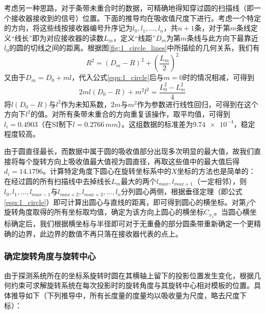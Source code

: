 考虑另一种思路，对于条带未重合时的数据，可精确地得知穿过圆的扫描线（即一个接收器接收到的信号）位置。下面的推导均在吸收值尺度下进行。考虑一个特定的方向，将这些线按接收器编号升序记为$l_0, l_1, \hdots, l_n$，共$n+1$条，对于第$m$条线定义“线长”即为对应接收器的读数$L_m$，定义“线距”$D_m$为第$m$条线与此方向下最靠近$l_0$的圆的切线之间的距离。根据图\ref{fig:1_circle_lines}中所描绘的几何关系，我们有
\begin{equation}\label{equ:1_circle}
  R^2=(D_m-R)^2+(\frac{L_m}{2})^2
\end{equation}
又由于$D_m=D_0+m l$，代入公式\ref{equ:1_circle}后与$m=0$时的情况相减，可得到
\begin{equation}\label{equ:1_reg}
  2 m l(D_0-R) + m^2 l^2 = \frac{L_0^2-L_m^2}{4}
\end{equation}
将$l(D_0-R)$与$l^2$作为未知系数，$2m$与$m^2$作为参数进行线性回归，可得到在这个方向下$l^2$的值。对所有条带未重合的方向重复该操作，取平均值，可得到$l_i=0.4903$（在SI制下$l=0.2766\,\si{mm}$）。这组数据的标准差为$\num{9.74e-4}$，稳定程度较高。

由于圆直径最长，而数据中属于圆的吸收值部分出现多次明显的最大值，故我们直接将每个旋转方向上吸收值最大值视为圆直径，再取这些值中的最大值后得$d_i=14.1796$。计算特定角度下圆心在旋转坐标系中的$X$坐标的方法也是简单的：在经过圆的所有扫描线中去掉线长$L_m$最大的两个$l_{max}, l_{max+1}$（一定相邻），则$l_0, l_1, \hdots, l_{max-1}$与$l_{max+2}, l_{max+3}, \hdots, l_n$分列圆心两侧，根据垂径定理（即公式\ref{equ:1_circle}）即可计算出圆心与直线的距离，即可得到圆心的横坐标。对第$j$个旋转角度取得的所有坐标取均值，确定为该方向上圆心的横坐标$C_{x_j}$。当圆心横坐标确定后，我们根据横坐标与半径即可对于无重叠的部分圆条带重新确定一个更精确的边界，此边界的数值不再只落在接收器代表的点上。

\subsubsection{确定旋转角度与旋转中心}

由于探测系统所在的坐标系旋转时圆在其横轴上留下的投影位置发生变化，根据几何约束可求解旋转系统在每次投影时的旋转角度与其旋转中心相对模板的位置。具体推导如下（下列推导中，所有长度量的度量均以吸收量为尺度，略去尺度下标）：

